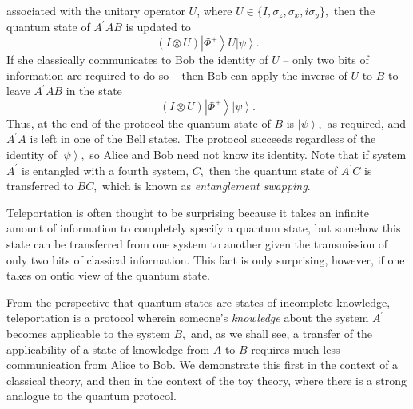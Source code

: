 \documentclass[pra,twocolumn,nofootinbib,showpacs]{revtex4}
\begin{document}
associated with the unitary operator $U$, where $U\in \{I,\sigma _{z},\sigma
_{x},i\sigma _{y}\},$ then the quantum state of $A^{\prime }AB$ is updated
to
\begin{equation}
(I\otimes U)\left| \Phi ^{+}\right\rangle U\left| \psi \right\rangle .
\end{equation}
If she classically communicates to Bob the identity of $U$ -- only two bits
of information are required to do so -- then Bob can apply the inverse of $U$
to $B$ to leave $A^{\prime }AB$ in the state
\begin{equation}
(I\otimes U)\left| \Phi ^{+}\right\rangle \left| \psi \right\rangle .
\end{equation}
Thus, at the end of the protocol the quantum state of $B$ is $\left| \psi
\right\rangle ,$ as required, and $A^{\prime }A$ is left in one of the Bell
states. The protocol succeeds regardless of the identity of $\left| \psi
\right\rangle ,$ so Alice and Bob need not know its identity. Note that if
system $A^{\prime }$ is entangled with a fourth system, $C,$ then the
quantum state of $A^{\prime }C$ is transferred to $BC,$ which is known as
\emph{entanglement swapping}.

Teleportation is often thought to be surprising because it takes an infinite
amount of information to completely specify a quantum state, but somehow
this state can be transferred from one system to another given the
transmission of only two bits of classical information. This fact is only
surprising, however, if one takes on ontic view of the quantum state. \strut
From the perspective that quantum states are states of incomplete knowledge,
teleportation is a protocol wherein someone's \emph{knowledge} about the
system $A^{\prime }$ becomes applicable to the system $B,$ and, as we shall
see, a transfer of the applicability of a state of knowledge from $A$ to $B$
requires much less communication from Alice to Bob. We demonstrate this
first in the context of a classical theory, and then in the context of the
toy theory, where there is a strong analogue to the quantum protocol.
\end{document}
